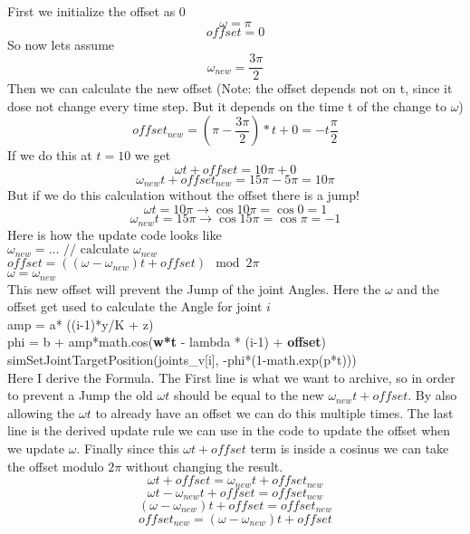 First we initialize the offset as 0
\[ \omega = \pi \]
\[ offset = 0 \]
So now lets assume
\[ \omega_{new} = \frac{3\pi}{2} \]
Then we can calculate the new offset (Note: the offset depends not on t, since it dose not change every time step. But it depends on the time t of the change to $\omega$)
\[ offset_{new} = (\pi - \frac{3\pi}{2}) * t + 0 = -t\frac{\pi}{2} \]
If we do this at $t = 10$ we get
\[ \omega t + offset = 10\pi + 0 \]
\[ \omega_{new}t + offset_{new} = 15\pi - 5\pi = 10\pi \]
But if we do this calculation without the offset there is a jump!
\[ \omega t = 10\pi \rightarrow \cos10\pi = \cos0 = 1 \]
\[ \omega_{new}t = 15\pi \rightarrow \cos15\pi = \cos\pi = -1 \]
Here is how the update code looks like\\
$ \omega_{new} = \dots \text{ // calculate } \omega_{new} $\\
$ offset = ((\omega - \omega_{new}) t + offset) \mod 2\pi $\\
$\omega = \omega_{new}$ \\
This new offset will prevent the Jump of the joint Angles.
Here the $\omega$ and the offset get used to calculate the Angle for joint $i$\\
amp = a* ((i-1)*y/K + z)\\
phi = b + amp*math.cos(\textbf{w*t} - lambda * (i-1) + \textbf{offset})\\
simSetJointTargetPosition(joints\_v[i], -phi*(1-math.exp(p*t)))\\

Here I derive the Formula. The First line is what we want to archive, so in order to prevent a Jump the old $\omega t$ should be equal to the new $\omega_{new}t + offset$. By also allowing the $\omega t$ to already have an offset we can do this multiple times. The last line is the derived update rule we can use in the code to update the offset when we update $\omega$. Finally since this $\omega t + offset$ term is inside a cosinus we can take the offset modulo $2\pi$ without changing the result.
\[ \omega t + offset = \omega_{new} t + offset_{new} \]
\[ \omega t - \omega_{new} t + offset = offset_{new} \]
\[ (\omega - \omega_{new}) t + offset = offset_{new} \]
\[ offset_{new} = (\omega - \omega_{new}) t + offset \]

